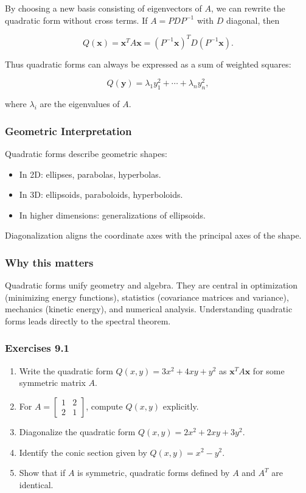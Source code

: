 \documentclass[
  12pt,
  a4paper,
]{article}
\begin{document}
By choosing a new basis consisting of eigenvectors of \(A\), we can
rewrite the quadratic form without cross terms. If \(A = PDP^{-1}\) with
\(D\) diagonal, then

\[Q(\mathbf{x}) = \mathbf{x}^T A \mathbf{x} = (P^{-1}\mathbf{x})^T D (P^{-1}\mathbf{x}).\]

Thus quadratic forms can always be expressed as a sum of weighted
squares:

\[Q(\mathbf{y}) = \lambda_1 y_1^2 + \cdots + \lambda_n y_n^2,\]

where \(\lambda_i\) are the eigenvalues of \(A\).

\subsubsection{Geometric
Interpretation}\label{geometric-interpretation-20}

Quadratic forms describe geometric shapes:

\begin{itemize}
\item
  In 2D: ellipses, parabolas, hyperbolas.
\item
  In 3D: ellipsoids, paraboloids, hyperboloids.
\item
  In higher dimensions: generalizations of ellipsoids.
\end{itemize}

Diagonalization aligns the coordinate axes with the principal axes of
the shape.

\subsubsection{Why this matters}\label{why-this-matters-32}

Quadratic forms unify geometry and algebra. They are central in
optimization (minimizing energy functions), statistics (covariance
matrices and variance), mechanics (kinetic energy), and numerical
analysis. Understanding quadratic forms leads directly to the spectral
theorem.

\subsubsection{Exercises 9.1}\label{exercises-91}

\begin{enumerate}
\def\labelenumi{\arabic{enumi}.}
\item
  Write the quadratic form \(Q(x,y) = 3x^2 + 4xy + y^2\) as
  \(\mathbf{x}^T A \mathbf{x}\) for some symmetric matrix \(A\).
\item
  For \(A = \begin{bmatrix} 1 & 2 \\ 2 & 1 \end{bmatrix}\), compute
  \(Q(x,y)\) explicitly.
\item
  Diagonalize the quadratic form \(Q(x,y) = 2x^2 + 2xy + 3y^2\).
\item
  Identify the conic section given by \(Q(x,y) = x^2 - y^2\).
\item
  Show that if \(A\) is symmetric, quadratic forms defined by \(A\) and
  \(A^T\) are identical.
\end{enumerate}
\end{document}
